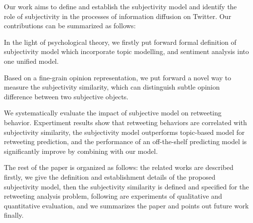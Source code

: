 \documentclass{acm_proc_article-sp}
\begin{document}
%

Our work aims to define and establish the subjectivity model and identify the role of subjectivity in the processes of information diffusion on Twitter. Our contributions can be summarized as follows:
\begin{itemize*}
\item In the light of psychological theory, we firstly put forward formal definition of subjectivity model which incorporate topic modelling, and sentiment analysis into one unified model. 
\item Based on a fine-grain opinion representation, we put forward a novel way to measure the subjectivity similarity, which can distinguish subtle opinion difference between two subjective objects.
\item We systematically evaluate the impact of subjective model on retweeting behavior. Expertiment results show that retweeting behaviors are correlated with subjectivity similarity, the subjectivity model outperforms topic-based model for retweeting prediction, and the performance of an off-the-shelf predicting model is significantly improve by combining with our model. 
\end{itemize*}
The rest of the paper is organized as follows: the related works are described firstly, we give the definition and establishment details of the proposed subjectivity model, then the subjectivity similarity is defined and specified for the retweeting analysis problem, following are experiments of qualitative and quantitative evaluation, and we summarizes the paper and points out future work finally.
\end{document}
